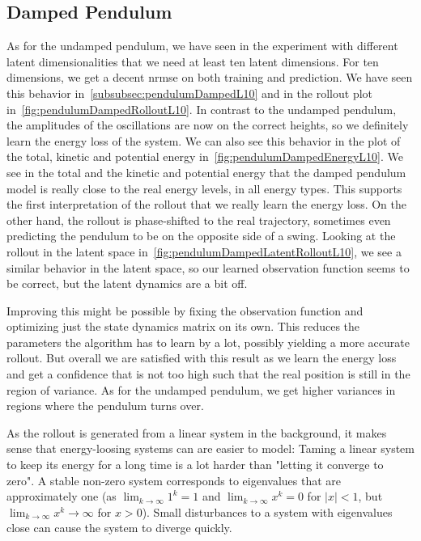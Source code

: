 	\subsection{Damped Pendulum}
		\label{subsec:discussDampedPendulum}

		As for the undamped pendulum, we have seen in the experiment with different latent dimensionalities that we need at least ten latent dimensions. For ten dimensions, we get a decent \ac{nrmse} on both training and prediction. We have seen this behavior in~\autoref{subsubsec:pendulumDampedL10} and in the rollout plot in~\autoref{fig:pendulumDampedRolloutL10}. In contrast to the undamped pendulum, the amplitudes of the oscillations are now on the correct heights, so we definitely learn the energy loss of the system. We can also see this behavior in the plot of the total, kinetic and potential energy in~\autoref{fig:pendulumDampedEnergyL10}. We see in the total and the kinetic and potential energy that the damped pendulum model is really close to the real energy levels, in all energy types. This supports the first interpretation of the rollout that we really learn the energy loss. On the other hand, the rollout is phase-shifted to the real trajectory, sometimes even predicting the pendulum to be on the opposite side of a swing. Looking at the rollout in the latent space in~\autoref{fig:pendulumDampedLatentRolloutL10}, we see a similar behavior in the latent space, so our learned observation function seems to be correct, but the latent dynamics are a bit off.

		Improving this might be possible by fixing the observation function and optimizing just the state dynamics matrix on its own. This reduces the parameters the algorithm has to learn by a lot, possibly yielding a more accurate rollout. But overall we are satisfied with this result as we learn the energy loss and get a confidence that is not too high such that the real position is still in the region of variance. As for the undamped pendulum, we get higher variances in regions where the pendulum turns over.

		As the rollout is generated from a linear system in the background, it makes sense that energy-loosing systems can are easier to model: Taming a linear system to keep its energy for a long time is a lot harder than "letting it converge to zero". A stable non-zero system corresponds to eigenvalues that are approximately one (as \( \lim_{k \to \infty} 1^k = 1 \) and \( \lim_{k \to \infty} x^k = 0 \) for \( \lvert x \rvert < 1 \), but \( \lim_{k \to \infty} x^k \to \infty \) for \( x > 0 \)). Small disturbances to a system with eigenvalues close can cause the system to diverge quickly.

